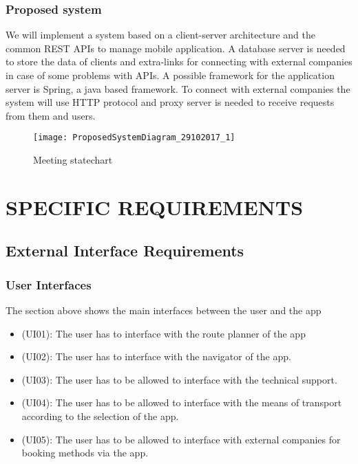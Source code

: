 \documentclass[a4paper,leqno]{book}
\begin{document}
\newpage
\subsection{Proposed system}
We will implement a system based on a client-server architecture and the common REST APIs to manage mobile application. A database server is needed to store the data of clients and extra-links for connecting with external companies in case of some problems with APIs. A possible framework for the application server is Spring, a java based framework. To connect with external companies the system will use HTTP protocol and proxy server is needed to receive requests from them and users.

\begin{figure}[!h]
	\begin{centering}
		\texttt{[image: ProposedSystemDiagram\_29102017\_1]}
	\end{centering}
	\caption{Meeting statechart}
\end{figure}


\chapter{SPECIFIC REQUIREMENTS}

\section{External Interface Requirements}

\subsection{User Interfaces}
The section above shows the main interfaces between the user and the app 
\begin{itemize}
\item (UI01): The user has to interface with the route planner of the app
\item (UI02): The user has to interface with the navigator of the app.
\item (UI03): The user has to be allowed to interface with the technical support.
\item (UI04): The user has to be allowed to interface with the means of transport according to the selection of the app.
\item (UI05): The user has to be allowed to interface with external companies for booking methods via the app.
\end{itemize}
\end{document}
